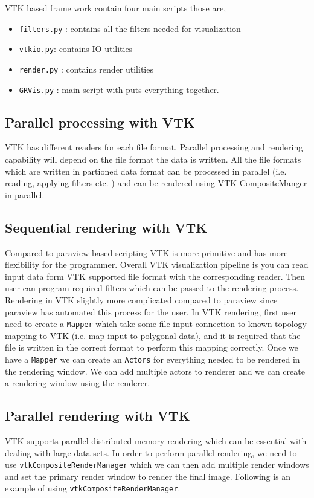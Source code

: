 VTK based frame work contain four main scripts those are, 
\begin{itemize}
	\item \texttt{filters.py} : contains all the filters needed for visualization
	\item \texttt{vtkio.py}: contains IO utilities
	\item \texttt{render.py} : contains render utilities
	\item \texttt{GRVis.py} : main script with puts everything together. 
\end{itemize}

\subsection{Parallel processing with VTK}
VTK has different readers for each file format. Parallel processing and rendering capability will depend on the file format the data is written. All the file formats which are written in partioned data format can be processed in parallel (i.e. reading, applying filters etc. )
and can be rendered using VTK CompositeManger in parallel. 

\subsection{Sequential rendering with VTK}
Compared to paraview based scripting VTK is more primitive and has more flexibility for the programmer. Overall VTK visualization pipeline is you can read input data form VTK supported file format with the corresponding reader. Then user can program required filters which can be passed to the rendering process. Rendering in VTK slightly more complicated compared to paraview since paraview has automated this process for the user. In VTK rendering, first user need to create a \texttt{Mapper} which take some file input connection to known topology mapping to VTK (i.e. map input to polygonal data), and it is required that the file is written in the correct format to perform this mapping correctly. Once we have a \texttt{Mapper} we can create an \texttt{Actors} for everything needed to be rendered in the rendering window. We can add multiple actors to renderer and we can create a rendering window using the renderer. 

\subsection{Parallel rendering with VTK}
VTK supports parallel distributed memory rendering which can be essential with dealing with large data sets. In order to perform parallel rendering, we need to use \texttt{vtkCompositeRenderManager} which we can then add multiple render windows and set the primary render window to render the final image. Following is an example of using \texttt{vtkCompositeRenderManager}.

